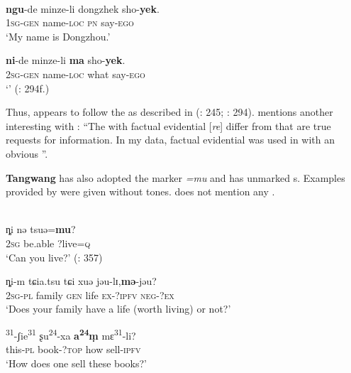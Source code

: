 \newpage 
\ea%
    \label{ex:trans:29}
    \\
    \ea
    \gll \textbf{{ngu}}-de    minze-li  dongzhek  sho-\textbf{yek}.\\
    1\textsc{sg}-\textsc{gen}  name-\textsc{loc}  \textsc{pn}    say-\textsc{ego}\\
    \glt ‘My name is Dongzhou.’
    
    \ex
    \gll \textbf{{ni}}-de    minze-li \textbf{ma} {sho-}\textbf{yek}.\\
    2\textsc{sg}-\textsc{gen}  name-\textsc{loc}  what    say-\textsc{ego}\\
    \glt ‘’ (\citealt{Sandman2016}: 294f.)
    \z
    \z

\noindent Thus,  appears to follow the  as described in  (\citealt{TournadreLaPolla2014}: 245; \citealt{Sandman2016}: 294). \citet[226]{Sandman2016} mentions another interesting  with : “The  with factual evidential [\textit{re}] differ from  that are true requests for information. In my data, factual evidential was used in  with an obvious ”.

\textbf{Tangwang} has also adopted the   marker \textit{=mu} and has unmarked s. Examples provided by \citet{Xu2014} were given without tones. \citet{Lee-Smith1996c} does not mention any .

 
\ea%
    \label{ex:trans:30}
    \\
    \ea
    \gll ȵi  nə {tsuə=}\textbf{{mu}}?\\
    2\textsc{sg}  be.able    ?live=\textsc{q}\\
    \glt ‘Can you live?’ (\citealt{Xu2014}: 357)
    
    \ex
    \gll ȵi-m    tɕia.tsu    tɕi  xuə  jəu-lɪ,\textbf{ {mə}}{-jəu?}\\
    2\textsc{sg}-\textsc{pl}    family    \textsc{gen}  life  \textsc{ex}-?\textsc{ipfv}  \textsc{neg-?ex}\\
    \glt ‘Does your family have a life (worth living) or not?’
    
    \ex
    \textsuperscript{31}-{ʃie}\textsuperscript{31} {ʂu}\textsuperscript{24}{-xa} \textbf{{a}}\textbf{\textsuperscript{24}}\textbf{{ṃ}} {mɛ}\textsuperscript{31}{-li?}\\
    this-\textsc{pl}    book-?\textsc{top}  how  sell-\textsc{ipfv}\\
    \glt ‘How does one sell these books?’ \citep[36]{Yibulaheimai1985}\z\z

